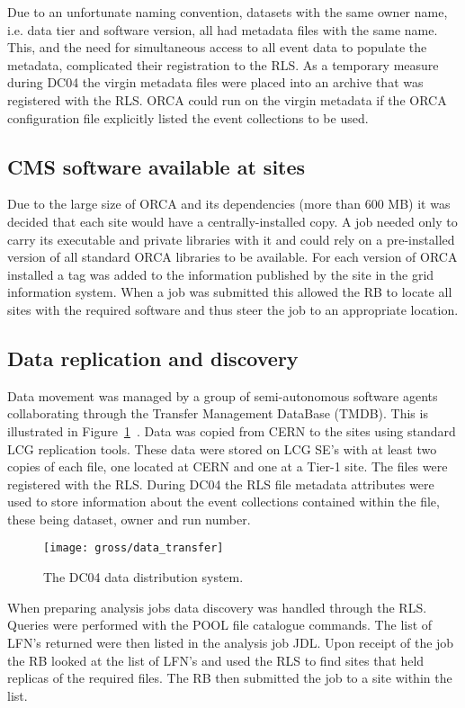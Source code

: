 Due to an unfortunate naming convention, datasets with the same owner name, i.e. data tier and software version, all had metadata files with the same name. This, and the need for simultaneous access to all event data to populate the metadata, complicated their registration to the RLS. As a temporary measure during DC04 the virgin metadata files were placed into an archive that was registered with the RLS. ORCA could run on the virgin metadata if the ORCA configuration file explicitly listed the event collections to be used.

\subsection{CMS software available at sites}
Due to the large size of ORCA and its dependencies (more than 600 MB) it was decided that each site would have a centrally-installed copy. A job needed only to carry its executable and private libraries with it and could rely on a pre-installed version of all standard ORCA libraries to be available. For each version of ORCA installed a tag was added to the information published by the site in the grid information system. When a job was submitted this allowed the RB to locate all sites with the required software and thus steer the job to an appropriate location.

\subsection{Data replication and discovery}
Data movement was managed by a group of semi-autonomous software agents collaborating through the Transfer Management DataBase (TMDB). This is illustrated in Figure~\ref{fig:data_transfer}~\cite{citeulike:623034, Fanfani:2004gh}. Data was copied from CERN to the sites using standard LCG replication tools. These data were stored on LCG SE's with at least two copies of each file, one located at CERN and one at a Tier-1 site. The files were registered with the RLS. During DC04 the RLS file metadata attributes were used to store information about the event collections contained within the file, these being dataset, owner and run number.

\begin{figure}[tbp]
  \centering
  \texttt{[image: gross/data\_transfer]}
  \caption{The DC04 data distribution system.~\cite{Fanfani:2004gh}
  \label{fig:data_transfer}}
\end{figure}

When preparing analysis jobs data discovery was handled through the RLS. Queries were performed with the POOL file catalogue commands. The list of LFN's returned were then listed in the analysis job JDL. Upon receipt of the job the RB looked at the list of LFN's and used the RLS to find sites that held replicas of the required files. The RB then submitted the job to a site within the list.

